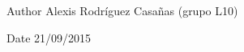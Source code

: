 \begin{DoxyAuthor}{Author}
Alexis Rodríguez Casañas (grupo L10) 
\end{DoxyAuthor}
\begin{DoxyDate}{Date}
21/09/2015 
\end{DoxyDate}
